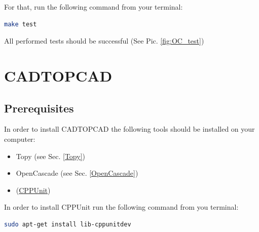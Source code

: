 \documentclass[11pt,a4paper,bibtotoc,idxtotoc,headsepline,footsepline,footexclude,DIV13,oneside]{scrbook}
\begin{document}
For that, run the following command from your terminal:
\begin{lstlisting}[language=bash]
make test
\end{lstlisting}
All performed tests should be successful (See Pic. \ref{fig:OC_test})


\chapter{CADTOPCAD}
\section{Prerequisites}
In order to install CADTOPCAD the following tools should be installed on your computer:
\begin{itemize}
	\item Topy (see Sec. \ref{Topy})
	\item OpenCascade (see Sec. \ref{OpenCascade})
	\item (\href{http://cppunit.sourceforge.net/doc/cvs/cppunit_cookbook.html}{CPPUnit})
	\end{itemize}
In order to install CPPUnit run the following command from you terminal:
\begin{lstlisting}[language=bash]
sudo apt-get install lib-cppunitdev
\end{lstlisting}

  	\clearemptydoublepage
	
 
\end{document}
